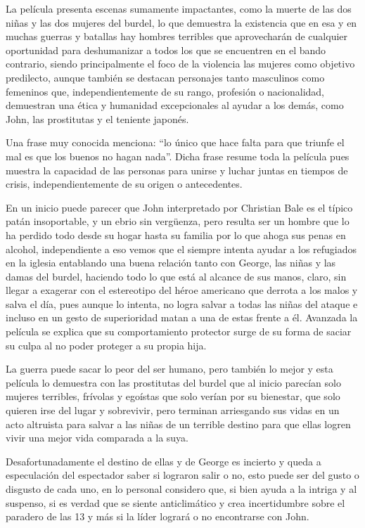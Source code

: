 \documentclass[letterpaper, 12pt]{report}
\begin{document}
La película presenta escenas sumamente impactantes, como la
muerte de las dos niñas y las dos mujeres del burdel, lo
que demuestra la existencia que en esa y en muchas guerras
y batallas hay hombres terribles que aprovecharán de
cualquier oportunidad para deshumanizar a todos los que se
encuentren en el bando contrario, siendo principalmente el
foco de la violencia las mujeres como objetivo predilecto,
aunque también se destacan personajes tanto masculinos como
femeninos que, independientemente de su rango, profesión o
nacionalidad, demuestran una ética y humanidad
excepcionales al ayudar a los demás, como John, las
prostitutas y el teniente japonés.

Una frase muy conocida menciona: “lo único que hace falta
para que triunfe el mal es que los buenos no hagan nada”.
Dicha frase resume toda la película pues muestra la
capacidad de las personas para unirse y luchar juntas en
tiempos de crisis, independientemente de su origen o
antecedentes.

En un inicio puede parecer que John interpretado por
Christian Bale es el típico patán insoportable, y un ebrio
sin vergüenza, pero resulta ser un hombre que lo ha perdido
todo desde su hogar hasta su familia por lo que ahoga sus
penas en alcohol, independiente a eso vemos que el siempre
intenta ayudar a los refugiados en la iglesia entablando
una buena relación tanto con George, las niñas y las damas
del burdel, haciendo todo lo que está al alcance de sus
manos, claro, sin llegar a exagerar con el estereotipo del
héroe americano que derrota a los malos y salva el día,
pues aunque lo intenta, no logra salvar a todas las niñas
del ataque e incluso en un gesto de superioridad matan a
una de estas frente a él. Avanzada la película se explica
que su comportamiento protector surge de su forma de saciar
su culpa al no poder proteger a su propia hija. 

La guerra
puede sacar lo peor del ser humano, pero también lo mejor y
esta película lo demuestra con las prostitutas del burdel
que al inicio parecían solo mujeres terribles, frívolas y
egoístas que solo verían por su bienestar, que solo quieren
irse del lugar y sobrevivir, pero terminan arriesgando sus
vidas en un acto altruista para salvar a las niñas de un
terrible destino para que ellas logren vivir una mejor vida
comparada a la suya. 

Desafortunadamente el destino de ellas
y de George es incierto y queda a especulación del
espectador saber si lograron salir o no, esto puede ser del
gusto o disgusto de cada uno, en lo personal considero que,
si bien ayuda a la intriga y al suspenso, si es verdad que
se siente anticlimático y crea incertidumbre sobre el
paradero de las 13 y más si la líder logrará o no encontrarse
con John. 
\end{document}
